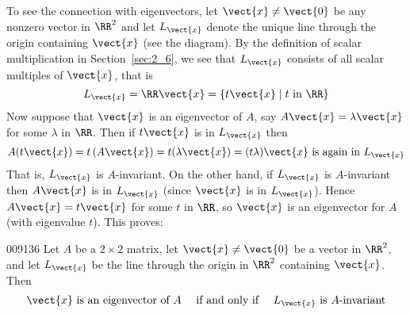 To see the connection with eigenvectors, let $\vect{x} \neq \vect{0}$ be any nonzero vector in $\RR^2$  and let $L_{\vect{x}}$ denote the unique line through the origin containing $\vect{x}$ (see the diagram). By the definition of scalar multiplication in Section~\ref{sec:2_6}, we see that $L_{\vect{x}}$ consists of all scalar multiples of $\vect{x}$, that is
\begin{equation*}
L_{\vect{x}} = \RR \vect{x} = \left\{ t\vect{x} \mid t \mbox{ in } \RR \right\}
\end{equation*}
\noindent Now suppose that $\vect{x}$ is an eigenvector of $A$, say $A\vect{x} = \lambda\vect{x}$ for some $\lambda$ in $\RR$. Then if $t\vect{x}$ is in $L_{\vect{x}}$ then
\begin{equation*}
A(t\vect{x}) = t\left(A\vect{x}\right) = t(\lambda \vect{x}) = (t\lambda)\vect{x} \mbox{ is again in } L_{\vect{x}}
\end{equation*}
That is, $L_{\vect{x}}$ is $A$-invariant. On the other hand, if $L_{\vect{x}}$ is $A$-invariant then $A\vect{x}$ is in $L_{\vect{x}}$ (since $\vect{x}$ is in $L_{\vect{x}}$). Hence $A\vect{x} = t\vect{x}$ for some $t$ in $\RR$, so $\vect{x}$ is an eigenvector for $A$ (with eigenvalue $t$). This proves:


\begin{theorem}{}{009136}
Let $A$ be a $2 \times 2$ matrix, let $\vect{x} \neq \vect{0}$ be a vector in $\RR^2$, and let $L_{\vect{x}}$ be the line through the origin in $\RR^2$ containing $\vect{x}$. Then
\begin{equation*}
\vect{x} \mbox{ is an eigenvector of } A \quad \mbox{ if and only if } \quad L_{\vect{x}} \mbox{ is } A\mbox{-invariant}
\end{equation*}
\end{theorem}


